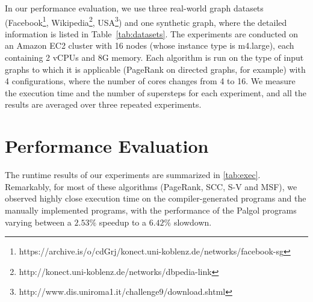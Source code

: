\documentclass{sokendai_thesis} %
\begin{document}
In our performance evaluation, we use three real-world graph datasets (Facebook\footnote{https://archive.is/o/cdGrj/konect.uni-koblenz.de/networks/facebook-sg}, Wikipedia\footnote{http://konect.uni-koblenz.de/networks/dbpedia-link}, USA\footnote{http://www.dis.uniroma1.it/challenge9/download.shtml}) and one synthetic graph, where the detailed information is listed in Table~\ref{tab:datasets}.
The experiments are conducted on an Amazon EC2 cluster with 16 nodes (whose instance type is m4.large), each containing 2 vCPUs and 8G memory.
Each algorithm is run on the type of input graphs to which it is applicable (PageRank on directed graphs, for example) with 4 configurations, where the number of cores changes from 4 to 16.
We measure the execution time and the number of supersteps for each experiment, and all the results are averaged over three repeated experiments.

\begin{table}[t]
 \centering
 \caption{Datasets for Performance Evaluation}
 \label{tab:datasets}
\end{table}

\section{Performance Evaluation}

The runtime results of our experiments are summarized in \autoref{tab:exec}.
Remarkably, for most of these algorithms (PageRank, SCC, S-V and MSF), we observed highly close execution time on the compiler-generated programs and the manually implemented programs,
with the performance of the Palgol programs varying between a $2.53\%$ speedup to a $6.42\%$ slowdown.
\end{document}
